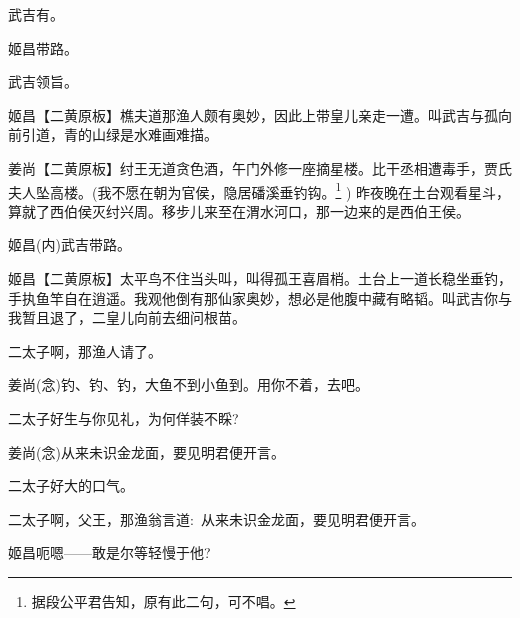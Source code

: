 {武吉\hspace{30pt}有。

姬昌\hspace{30pt}带路。

武吉\hspace{30pt}领旨。

\setlength{\hangindent}{56pt}   %
{姬昌\hspace{30pt}【{\akai 二黄原板}】樵夫道那渔人颇有奥妙，因此上带皇儿亲走一遭。叫武吉与孤向前引道，青的山绿是水难画难描。}

\vspace{5pt}

\setlength{\hangindent}{56pt}   %
{姜尚\hspace{30pt}【{\akai 二黄原板}】纣王无道贪色酒，午门外修一座摘星楼。比干丞相遭毒手，贾氏夫人坠高楼。(我不愿在朝为官侯，隐居磻溪垂钓钩。\footnote{据段公平{\scriptsize 君}告知，原有此二句，可不唱。}%
) 昨夜晚在土台观看星斗，算就了西伯侯灭纣兴周。移步儿来至在渭水河口，那一边来的是西伯王侯。}

姬昌\hspace{30pt}({\akai 内})武吉带路。

\setlength{\hangindent}{56pt}   %
{姬昌\hspace{30pt}【{\akai 二黄原板}】太平鸟不住当头叫，叫得孤王喜眉梢。土台上一道长稳坐垂钓，手执鱼竿自在逍遥。我观他倒有那仙家奥妙，想必是他腹中藏有略韬。叫武吉你与我暂且退了，二皇儿向前去细问根苗。}

{\akai 二}太子\hspace{20pt}啊，那渔人请了。

姜尚\hspace{30pt}({\akai 念})钓、钓、钓，大鱼不到小鱼到。用你不着，去吧。

{\akai 二}太子\hspace{20pt}好生与你见礼，为何佯装不睬?

姜尚\hspace{30pt}({\akai 念})从来未识金龙面，要见明君便开言。

{\akai 二}太子\hspace{20pt}好大的口气。

{\akai 二}太子\hspace{20pt}啊，父王，那渔翁言道:~从来未识金龙面，要见明君便开言。

姬昌\hspace{30pt}呃嗯------敢是尔等轻慢于他?

}
